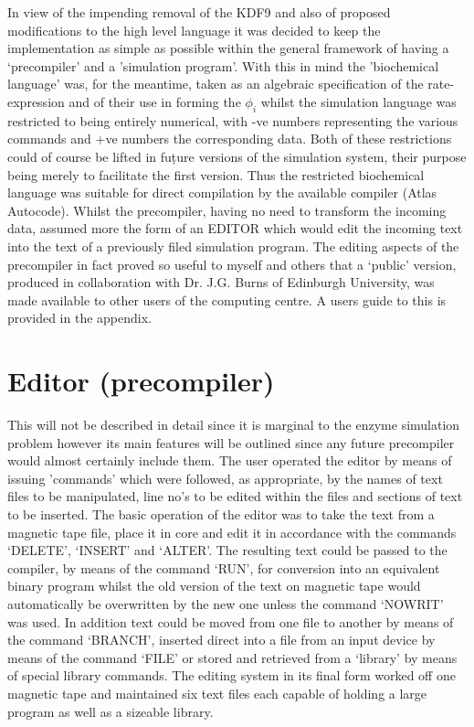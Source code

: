 In view of the impending removal of the KDF9 and also of proposed modifications to the high level language it was decided to keep the implementation as simple as possible within the general framework of having a `precompiler' and a 'simulation program'. With this in mind the 'biochemical language' was, for the meantime, taken as an algebraic specification of the rate-expression and of their use in forming the $\phi_{i}$ whilst the simulation language was restricted to being entirely numerical, with -ve numbers representing the various commands and +ve numbers the corresponding data. Both of these restrictions could of course be lifted in fuṭure versions of the simulation system, their purpose being merely to facilitate the first version. Thus the restricted biochemical language was suitable for direct compilation by the available compiler (Atlas Autocode). Whilst the precompiler, having no need to transform the incoming data, assumed more the form of an EDITOR which would edit the incoming text into the text of a previously filed simulation program. The editing aspects of the precompiler in fact proved so useful to myself and others that a `public' version, produced in collaboration with Dr. J.G. Burns of Edinburgh University, was made available to other users of the computing centre. A users guide to this is provided in the appendix.

\section{Editor (precompiler)}

This will not be described in detail since it is marginal to the enzyme simulation problem however its main features will be outlined since any future precompiler would almost certainly include them. The user operated the editor by means of issuing 'commands' which were followed, as appropriate, by the names of text files to be manipulated, line no's to be edited within the files and sections of text to be inserted. The basic operation of the editor was to take the text from a magnetic tape file, place it in core and edit it in accordance with the commands `DELETE', `INSERT' and `ALTER'. The resulting text could be passed to the compiler, by means of the command `RUN', for conversion into an equivalent binary program whilst the old version of the text on magnetic tape would automatically be overwritten by the new one unless the command `NOWRIT' was used. In addition text could be moved from one file to another by means of the command `BRANCH', inserted direct into a file from an input device by means of the command `FILE' or stored and retrieved from a `library' by means of special library commands. The editing system in its final form worked off one magnetic tape and maintained six text files each capable of holding a large program as well as a sizeable library.


